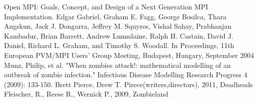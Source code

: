 \documentclass{report}
\begin{document}
\begin{thebibliography}{99}
Open MPI: Goals, Concept, and Design of a Next Generation MPI Implementation. Edgar Gabriel, Graham E. Fagg, George Bosilca, Thara Angskun, Jack J. Dongarra, Jeffrey M. Squyres, Vishal Sahay, Prabhanjan Kambadur, Brian Barrett, Andrew Lumsdaine, Ralph H. Castain, David J. Daniel, Richard L. Graham, and Timothy S. Woodall. In Proceedings, 11th European PVM/MPI Users' Group Meeting, Budapest, Hungary, September 2004
Munz, Philip, et al. "When zombies attack!: mathematical modelling of an outbreak of zombie infection." Infectious Disease Modelling Research Progress 4 (2009): 133-150.
Brett Pierce, Drew T. Pirece(writers,directors), 2011, Deadheads
Fleischer, R., Reese R., Wernick P., 2009, Zombieland 
\end{thebibliography}
\end{document}
